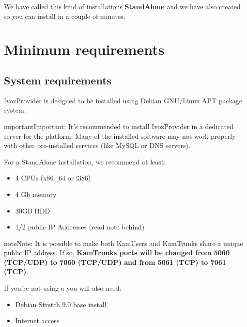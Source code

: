 \documentclass[letterpaper,10pt,english]{sphinxmanual}
\begin{document}
We have called this kind of installations \textbf{StandAlone} and we have also
created {\hyperref[basic_concepts/installation/cd_install:automatic\string-iso\string-cd\string-image]{}} so you can install in a couple of minutes.


\section{Minimum requirements}
\label{basic_concepts/installation/requirements:minimum-requirements}\label{basic_concepts/installation/requirements::doc}

\subsection{System requirements}
\label{basic_concepts/installation/requirements:system-requirements}
IvozProvider is designed to be installed using Debian GNU/Linux APT package
system.

\begin{notice}{important}{Important:}
It's recommended to install IvozProvider in a dedicated server
for the platform. Many of the installed software may not work properly with
other pre-installed services (like MySQL or DNS servers).
\end{notice}

For a StandAlone installation, we recommend at least:
\begin{itemize}
\item {} 
4 CPUs (x86\_64 or i386)

\item {} 
4 Gb memory

\item {} 
30GB HDD

\item {} 
1/2 public IP Addresses (read note behind)

\end{itemize}

\begin{notice}{note}{Note:}
It is possible to make both KamUsers and KamTrunks
share a unique public IP address. If so, \textbf{KamTrunks ports will be changed
from 5060 (TCP/UDP) to 7060 (TCP/UDP) and from 5061 (TCP) to 7061 (TCP)}.
\end{notice}

If you're not using a {\hyperref[basic_concepts/installation/cd_install:automatic\string-iso\string-cd\string-image]{}} you will also need:
\begin{itemize}
\item {} 
Debian Stretch 9.0 base install

\item {} 
Internet access

\end{itemize}
\end{document}
